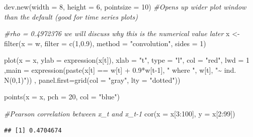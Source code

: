 \documentclass[
]{book}
\newenvironment{Shaded}{\begin{snugshade}}{\end{snugshade}}
\newcommand{\AttributeTok}[1]{\textcolor[rgb]{0.77,0.63,0.00}{#1}}
\newcommand{\CommentTok}[1]{\textcolor[rgb]{0.56,0.35,0.01}{\textit{#1}}}
\newcommand{\DecValTok}[1]{\textcolor[rgb]{0.00,0.00,0.81}{#1}}
\newcommand{\FloatTok}[1]{\textcolor[rgb]{0.00,0.00,0.81}{#1}}
\newcommand{\FunctionTok}[1]{\textcolor[rgb]{0.00,0.00,0.00}{#1}}
\newcommand{\NormalTok}[1]{#1}
\newcommand{\OtherTok}[1]{\textcolor[rgb]{0.56,0.35,0.01}{#1}}
\newcommand{\SpecialCharTok}[1]{\textcolor[rgb]{0.00,0.00,0.00}{#1}}
\newcommand{\StringTok}[1]{\textcolor[rgb]{0.31,0.60,0.02}{#1}}
\theoremstyle{definition}
\theoremstyle{definition}
\theoremstyle{definition}
\theoremstyle{definition}
\theoremstyle{remark}
\begin{document}
\begin{Shaded}
\begin{Highlighting}[]
\FunctionTok{dev.new}\NormalTok{(}\AttributeTok{width =} \DecValTok{8}\NormalTok{, }\AttributeTok{height =} \DecValTok{6}\NormalTok{, }\AttributeTok{pointsize =} \DecValTok{10}\NormalTok{)  }
\CommentTok{\#Opens up wider plot window than the default (good for time series plots)}

\CommentTok{\#rho = 0.4972376 we will discuss why this is the numerical value later}
\NormalTok{x }\OtherTok{\textless{}{-}} \FunctionTok{filter}\NormalTok{(}\AttributeTok{x =}\NormalTok{ w, }\AttributeTok{filter =} \FunctionTok{c}\NormalTok{(}\DecValTok{1}\NormalTok{,}\FloatTok{0.9}\NormalTok{), }\AttributeTok{method =} \StringTok{"convolution"}\NormalTok{, }\AttributeTok{sides =} \DecValTok{1}\NormalTok{)}

\FunctionTok{plot}\NormalTok{(}\AttributeTok{x =}\NormalTok{ x, }\AttributeTok{ylab =} \FunctionTok{expression}\NormalTok{(x[t]), }\AttributeTok{xlab =} \StringTok{"t"}\NormalTok{, }\AttributeTok{type =} \StringTok{"l"}\NormalTok{, }\AttributeTok{col =} \StringTok{"red"}\NormalTok{, }\AttributeTok{lwd =} \DecValTok{1}\NormalTok{ ,}\AttributeTok{main =} \FunctionTok{expression}\NormalTok{(}\FunctionTok{paste}\NormalTok{(x[t] }\SpecialCharTok{==}\NormalTok{ w[t] }\SpecialCharTok{+} \FloatTok{0.9}\SpecialCharTok{*}\NormalTok{w[t}\DecValTok{{-}1}\NormalTok{], }\StringTok{" where "}\NormalTok{, w[t], }\StringTok{"\textasciitilde{} ind. N(0,1)"}\NormalTok{)) , }\AttributeTok{panel.first=}\FunctionTok{grid}\NormalTok{(}\AttributeTok{col =} \StringTok{"gray"}\NormalTok{, }\AttributeTok{lty =} \StringTok{"dotted"}\NormalTok{))}

\FunctionTok{points}\NormalTok{(}\AttributeTok{x =}\NormalTok{ x, }\AttributeTok{pch =} \DecValTok{20}\NormalTok{, }\AttributeTok{col =} \StringTok{"blue"}\NormalTok{)}

\CommentTok{\#Pearson correlation between x\_t and x\_t{-}1 }
\FunctionTok{cor}\NormalTok{(}\AttributeTok{x =}\NormalTok{ x[}\DecValTok{3}\SpecialCharTok{:}\DecValTok{100}\NormalTok{], }\AttributeTok{y =}\NormalTok{ x[}\DecValTok{2}\SpecialCharTok{:}\DecValTok{99}\NormalTok{]) }
\end{Highlighting}
\end{Shaded}

\begin{verbatim}
## [1] 0.4704674
\end{verbatim}
\end{document}
